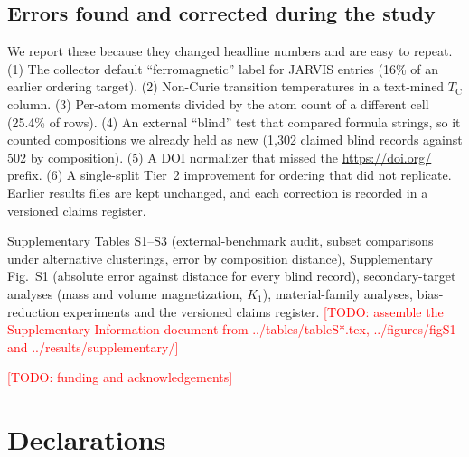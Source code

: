 \documentclass[pdflatex,sn-nature]{sn-jnl}
\newcommand{\todo}[1]{\textcolor{red}{[TODO: #1]}}
\newcommand{\Tc}{\ensuremath{T_\mathrm{C}}}
\begin{document}
\subsection{Errors found and corrected during the study}
We report these because they changed headline numbers and are easy to repeat. (1) The collector default ``ferromagnetic'' label for JARVIS entries (16\% of an earlier ordering target). (2) Non-Curie transition temperatures in a text-mined \Tc{} column. (3) Per-atom moments divided by the atom count of a different cell (25.4\% of rows). (4) An external ``blind'' test that compared formula strings, so it counted compositions we already held as new (1,302 claimed blind records against 502 by composition). (5) A DOI normalizer that missed the \url{https://doi.org/} prefix. (6) A single-split Tier~2 improvement for ordering that did not replicate. Earlier results files are kept unchanged, and each correction is recorded in a versioned claims register.

\backmatter

Supplementary Tables S1--S3 (external-benchmark audit, subset comparisons under alternative clusterings, error by composition distance), Supplementary Fig.~S1 (absolute error against distance for every blind record), secondary-target analyses (mass and volume magnetization, $K_1$), material-family analyses, bias-reduction experiments and the versioned claims register. \todo{assemble the Supplementary Information document from ../tables/tableS*.tex, ../figures/figS1 and ../results/supplementary/}

\todo{funding and acknowledgements}

\section*{Declarations}
\end{document}
